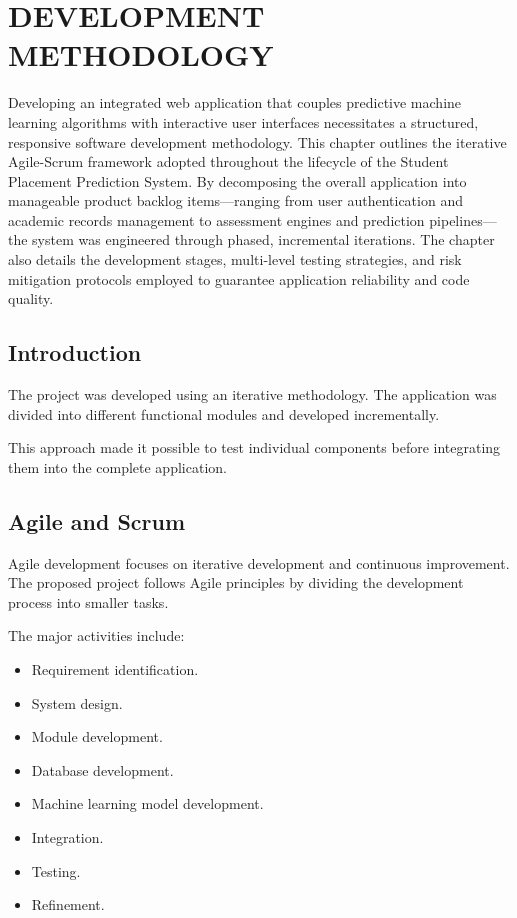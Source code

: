\documentclass[12pt,a4paper]{report}
\begin{document}

\chapter{DEVELOPMENT METHODOLOGY}

Developing an integrated web application that couples predictive machine
learning algorithms with interactive user interfaces necessitates a structured,
responsive software development methodology. This chapter outlines the
iterative Agile-Scrum framework adopted throughout the lifecycle of the
Student Placement Prediction System. By decomposing the overall application
into manageable product backlog items---ranging from user authentication and
academic records management to assessment engines and prediction
pipelines---the system was engineered through phased, incremental iterations.
The chapter also details the development stages, multi-level testing
strategies, and risk mitigation protocols employed to guarantee application
reliability and code quality.

\section{Introduction}

The project was developed using an iterative methodology. The
application was divided into different functional modules and
developed incrementally.

This approach made it possible to test individual components
before integrating them into the complete application.

\section{Agile and Scrum}

Agile development focuses on iterative development and continuous
improvement. The proposed project follows Agile principles by
dividing the development process into smaller tasks.

The major activities include:

\begin{itemize}
    \item Requirement identification.
    \item System design.
    \item Module development.
    \item Database development.
    \item Machine learning model development.
    \item Integration.
    \item Testing.
    \item Refinement.
\end{itemize}
\end{document}
